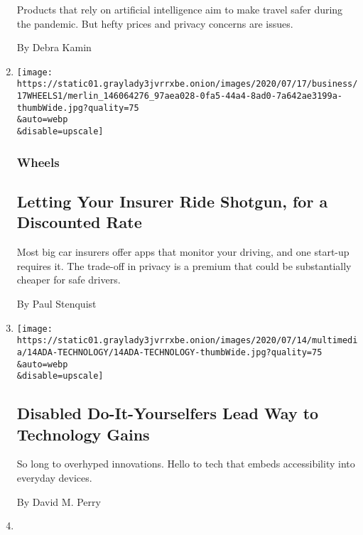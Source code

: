 \begin{enumerate}
  Products that rely on artificial intelligence aim to make travel safer
  during the pandemic. But hefty prices and privacy concerns are issues.

  By Debra Kamin
\item
  \href{/2020/07/16/business/car-insurance-app-discounts.html}{}

  \texttt{[image: https://static01.graylady3jvrrxbe.onion/images/2020/07/17/business/17WHEELS1/merlin\_146064276\_97aea028-0fa5-44a4-8ad0-7a642ae3199a-thumbWide.jpg?quality=75\\\&auto=webp\\\&disable=upscale]}

  \hypertarget{wheels}{%
  \subsubsection{Wheels}\label{wheels}}

  \hypertarget{letting-your-insurer-ride-shotgun-for-a-discounted-rate}{%
  \subsection{Letting Your Insurer Ride Shotgun, for a Discounted
  Rate}\label{letting-your-insurer-ride-shotgun-for-a-discounted-rate}}

  Most big car insurers offer apps that monitor your driving, and one
  start-up requires it. The trade-off in privacy is a premium that could
  be substantially cheaper for safe drivers.

  By Paul Stenquist
\item
  \href{/2020/07/14/style/assistive-technology.html}{}

  \texttt{[image: https://static01.graylady3jvrrxbe.onion/images/2020/07/14/multimedia/14ADA-TECHNOLOGY/14ADA-TECHNOLOGY-thumbWide.jpg?quality=75\\\&auto=webp\\\&disable=upscale]}

  \hypertarget{disabled-do-it-yourselfers-lead-way-to-technology-gains}{%
  \subsection{Disabled Do-It-Yourselfers Lead Way to Technology
  Gains}\label{disabled-do-it-yourselfers-lead-way-to-technology-gains}}

  So long to overhyped innovations. Hello to tech that embeds
  accessibility into everyday devices.

  By David M. Perry
\item
  \href{/2020/07/07/health/vision-problems-technology-headsets.html}{}


\end{enumerate}

